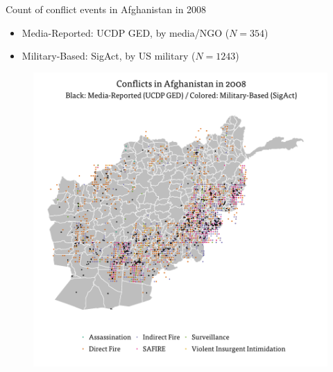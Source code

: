 \documentclass[article,36pt,extrafontsizes,oneside,openany,oldfontcommands]{memoir}
\begin{document}
\begin{adjmulticols*}{3}{0.5in}{0.5in}
\begin{adjustwidth}{0.1in}{0.1in}
Count of conflict events in Afghanistan in 2008
\vspace{.2in}
\begin{itemize}[topsep=0pt,itemsep=0ex,partopsep=1ex,parsep=1ex]
\item Media-Reported: UCDP GED, by media/NGO ($N=354$)
\item Military-Based: SigAct, by US military ($N=1243$)
\end{itemize} 
\begin{figure} 
\centering 
\includegraphics[width=.85\linewidth]{afg_map.pdf}
\end{figure}
\end{adjustwidth}

\columnbreak

\begin{minipage}{.65\linewidth}


\end{minipage}
\end{adjmulticols*}
\end{document}
